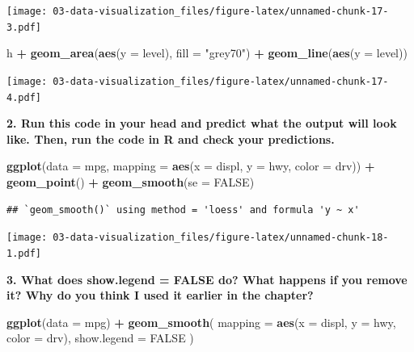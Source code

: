 \documentclass[]{book}
\newenvironment{Shaded}{\begin{snugshade}}{\end{snugshade}}
\newcommand{\DataTypeTok}[1]{\textcolor[rgb]{0.13,0.29,0.53}{#1}}
\newcommand{\KeywordTok}[1]{\textcolor[rgb]{0.13,0.29,0.53}{\textbf{#1}}}
\newcommand{\NormalTok}[1]{#1}
\newcommand{\OperatorTok}[1]{\textcolor[rgb]{0.81,0.36,0.00}{\textbf{#1}}}
\newcommand{\OtherTok}[1]{\textcolor[rgb]{0.56,0.35,0.01}{#1}}
\newcommand{\StringTok}[1]{\textcolor[rgb]{0.31,0.60,0.02}{#1}}
\theoremstyle{definition}
\theoremstyle{definition}
\theoremstyle{definition}
\theoremstyle{remark}
\begin{document}
\texttt{[image: 03-data-visualization\_files/figure-latex/unnamed-chunk-17-3.pdf]}

\begin{Shaded}
\begin{Highlighting}[]
\NormalTok{h }\OperatorTok{+}
\StringTok{  }\KeywordTok{geom_area}\NormalTok{(}\KeywordTok{aes}\NormalTok{(}\DataTypeTok{y =}\NormalTok{ level), }\DataTypeTok{fill =} \StringTok{"grey70"}\NormalTok{) }\OperatorTok{+}
\StringTok{  }\KeywordTok{geom_line}\NormalTok{(}\KeywordTok{aes}\NormalTok{(}\DataTypeTok{y =}\NormalTok{ level))}
\end{Highlighting}
\end{Shaded}

\texttt{[image: 03-data-visualization\_files/figure-latex/unnamed-chunk-17-4.pdf]}

\textbf{2. Run this code in your head and predict what the output will
look like. Then, run the code in R and check your predictions.}

\begin{Shaded}
\begin{Highlighting}[]
\KeywordTok{ggplot}\NormalTok{(}\DataTypeTok{data =}\NormalTok{ mpg, }\DataTypeTok{mapping =} \KeywordTok{aes}\NormalTok{(}\DataTypeTok{x =}\NormalTok{ displ, }\DataTypeTok{y =}\NormalTok{ hwy, }\DataTypeTok{color =}\NormalTok{ drv)) }\OperatorTok{+}\StringTok{ }
\StringTok{  }\KeywordTok{geom_point}\NormalTok{() }\OperatorTok{+}\StringTok{ }
\StringTok{  }\KeywordTok{geom_smooth}\NormalTok{(}\DataTypeTok{se =} \OtherTok{FALSE}\NormalTok{)}
\end{Highlighting}
\end{Shaded}

\begin{verbatim}
## `geom_smooth()` using method = 'loess' and formula 'y ~ x'
\end{verbatim}

\texttt{[image: 03-data-visualization\_files/figure-latex/unnamed-chunk-18-1.pdf]}

\textbf{3. What does show.legend = FALSE do? What happens if you remove
it? Why do you think I used it earlier in the chapter?}

\begin{Shaded}
\begin{Highlighting}[]
\KeywordTok{ggplot}\NormalTok{(}\DataTypeTok{data =}\NormalTok{ mpg) }\OperatorTok{+}
\StringTok{  }\KeywordTok{geom_smooth}\NormalTok{(}
    \DataTypeTok{mapping =} \KeywordTok{aes}\NormalTok{(}\DataTypeTok{x =}\NormalTok{ displ, }\DataTypeTok{y =}\NormalTok{ hwy, }\DataTypeTok{color =}\NormalTok{ drv),}
    \DataTypeTok{show.legend =} \OtherTok{FALSE}
\NormalTok{  )}
\end{Highlighting}
\end{Shaded}
\end{document}
